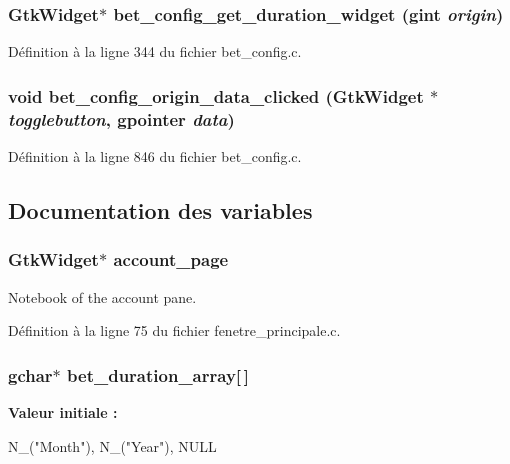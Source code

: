 \subsubsection[{bet\_\-config\_\-get\_\-duration\_\-widget}]{\setlength{\rightskip}{0pt plus 5cm}GtkWidget$\ast$ bet\_\-config\_\-get\_\-duration\_\-widget (gint {\em origin})}\label{bet__config_8c_a9fcc68ddba810306496668a2ab91abf9}


Définition à la ligne 344 du fichier bet\_\-config.c.

\subsubsection[{bet\_\-config\_\-origin\_\-data\_\-clicked}]{\setlength{\rightskip}{0pt plus 5cm}void bet\_\-config\_\-origin\_\-data\_\-clicked (GtkWidget $\ast$ {\em togglebutton}, \/  gpointer {\em data})}\label{bet__config_8c_af35307117be15ea41c6a5eebcefdf975}


Définition à la ligne 846 du fichier bet\_\-config.c.



\subsection{Documentation des variables}
\subsubsection[{account\_\-page}]{\setlength{\rightskip}{0pt plus 5cm}GtkWidget$\ast$ {\bf account\_\-page}}\label{bet__config_8c_ad5443d986a9ab5d64dd84c5346c4b87c}
Notebook of the account pane. 

Définition à la ligne 75 du fichier fenetre\_\-principale.c.

\subsubsection[{bet\_\-duration\_\-array}]{\setlength{\rightskip}{0pt plus 5cm}gchar$\ast$ {\bf bet\_\-duration\_\-array}[$\,$]}\label{bet__config_8c_a9bc40d97c6989df4ee885344bc8110cd}
{\bfseries Valeur initiale :}
\begin{DoxyCode}
 {
    N_("Month"),
    N_("Year"),
    NULL
}
\end{DoxyCode}


